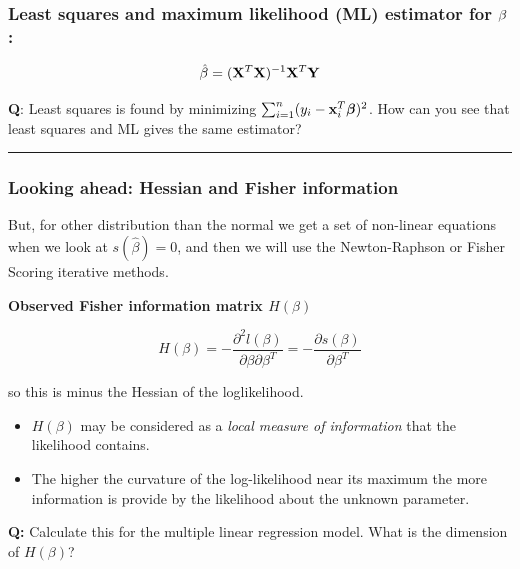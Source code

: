 \documentclass[
]{article}
\providecommand{\tightlist}{%
  \setlength{\itemsep}{0pt}\setlength{\parskip}{0pt}}
\begin{document}
\hypertarget{least-squares-and-maximum-likelihood-ml-estimator-for-bf-beta}{%
\subsubsection{\texorpdfstring{Least squares and maximum likelihood (ML)
estimator for
\({\bf \beta}\):}{Least squares and maximum likelihood (ML) estimator for \{\textbackslash bf \textbackslash beta\}:}}\label{least-squares-and-maximum-likelihood-ml-estimator-for-bf-beta}}

\[ \hat\beta=({\bf X}^T{\bf X})^{-1} {\bf X}^T {\bf Y}\]

\textbf{Q}: Least squares is found by minimizing
\(\sum_{i=1}^n (y_i-{\bf x}_i^T \boldsymbol{\beta})^2\). How can you see
that least squares and ML gives the same estimator?

\begin{center}\rule{0.5\linewidth}{0.5pt}\end{center}

\hypertarget{looking-ahead-hessian-and-fisher-information}{%
\subsubsection{Looking ahead: Hessian and Fisher
information}\label{looking-ahead-hessian-and-fisher-information}}

But, for other distribution than the normal we get a set of non-linear
equations when we look at \(s(\hat{\beta})=0\), and then we will use the
Newton-Raphson or Fisher Scoring iterative methods.

\textbf{Observed Fisher information matrix \(H(\beta)\)}

\[H(\beta) = -\frac{\partial^2l(\beta)}{\partial\beta\partial\beta^T} = -\frac{\partial s(\beta)}{\partial\beta^T}\]

so this is minus the Hessian of the loglikelihood.

\begin{itemize}
\tightlist
\item
  \(H(\beta)\) may be considered as a \emph{local measure of
  information} that the likelihood contains.
\item
  The higher the curvature of the log-likelihood near its maximum the
  more information is provide by the likelihood about the unknown
  parameter.
\end{itemize}

\textbf{Q:} Calculate this for the multiple linear regression model.
What is the dimension of \(H(\beta)\)?
\end{document}
